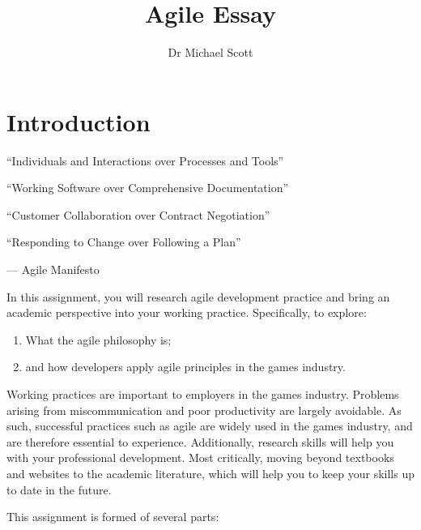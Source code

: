 \documentclass{../fal_assignment}
\title{Agile Essay}
\author{Dr Michael Scott}
\begin{document}
\maketitle

\section*{Introduction}

\begin{marginquote}
  ``Individuals and Interactions over Processes and Tools''
  
  ``Working Software over Comprehensive Documentation''
  
  ``Customer Collaboration over Contract Negotiation''
  
  ``Responding to Change over Following a Plan''
    
    --- Agile Manifesto
\end{marginquote}

In this assignment, you will research agile development practice and bring an academic perspective into your working practice. Specifically, to explore: 

\begin{enumerate}[label=(\roman*)]
    \item What the agile philosophy is;
    \item and how developers apply agile principles in the games industry.
\end{enumerate}

Working practices are important to employers in the games industry. Problems arising from miscommunication and poor productivity are largely avoidable. As such, successful practices such as agile are widely used in the games industry, and are therefore essential to experience. Additionally, research skills will help you with your professional development. Most critically, moving beyond textbooks and websites to the academic literature, which will help you to keep your skills up to date in the future.

This assignment is formed of several parts:
\end{document}

